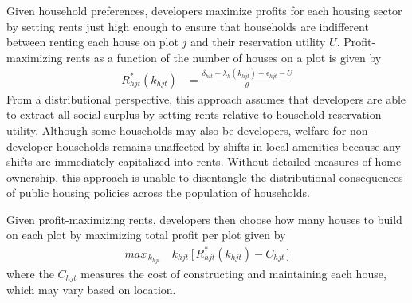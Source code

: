 \documentclass[12pt]{article}
\begin{document}
Given household preferences, developers maximize profits for each housing sector by setting rents just high enough to ensure that households are indifferent between renting each house on plot $j$ and their reservation utility $\overline{U}$.  Profit-maximizing rents as a function of the number of houses on a plot is given by
\begin{align}
\label{eq:rent}
R_{hjt}^{*}(k_{hjt}) &= \frac{ \delta_{hlt} - \lambda_{h}(k_{hjt}) + \epsilon_{hjt} - \overline{U}}{\theta}
\end{align}
From a distributional perspective, this approach assumes that developers are able to extract all social surplus by setting rents relative to household reservation utility.  Although some households may also be developers, welfare for non-developer households remains unaffected by shifts in local amenities because any shifts are immediately capitalized into rents.  Without detailed measures of home ownership, this approach is unable to disentangle the distributional consequences of public housing policies across the population of households.

Given profit-maximizing rents, developers then choose how many houses to build on each plot by maximizing total profit per plot given by
\begin{align*}
max_{\,k_{hjt}} \,\,\,\,\,\,  k_{hjt} \, \Big[ \, R_{hjt}^{*}(k_{hjt}) - C_{hjt} \, \Big ]
\end{align*}
\noindent where the $C_{hjt}$ measures the cost of constructing and maintaining each house, which may vary based on location.

\end{document}

